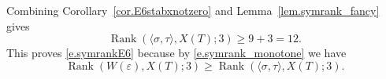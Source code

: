 \documentclass[12pt]{amsart}
\numberwithin{equation}{section}
\theoremstyle{definition}
\newcommand{\SymRank}{\operatorname{Rank}}
\newcommand{\eps}{\varepsilon}
\begin{document}
Combining Corollary~\ref{cor.E6stabxnotzero} and Lemma~\ref{lem.symrank_fancy} gives
$$\SymRank(\langle \sigma,\tau \rangle, X(T);3) \geq 9+3= 12.$$
This proves \eqref{e.symrankE6} because by \eqref{e.symrank_monotone} we have
    $$\SymRank(W(\eps),X(T);3) \geq \SymRank(\langle \sigma,\tau \rangle, X(T);3).$$





\end{document}

